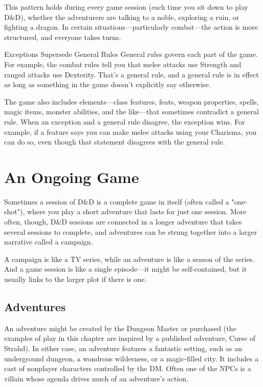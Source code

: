 \documentclass[10pt,a4paper,twoside,bg=print,twocolumn,openany,nodeprecatedcode]{dndbook}
\begin{document}
This pattern holds during every game session (each time you sit down to play D\&D), whether the adventurers are talking to a noble, exploring a ruin, or fighting a dragon. In certain situations—particularly combat—the action is more structured, and everyone takes turns.

\begin{DndSidebar}[float=!b]{Exceptions Supersede General Rules}
General rules govern each part of the game. For example, the combat rules tell you that melee attacks use Strength and ranged attacks use Dexterity. That's a general rule, and a general rule is in effect as long as something in the game doesn't explicitly say otherwise.



The game also includes elements—class features, feats, weapon properties, spells, magic items, monster abilities, and the like—that sometimes contradict a general rule. When an exception and a general rule disagree, the exception wins. For example, if a feature says you can make melee attacks using your Charisma, you can do so, even though that statement disagrees with the general rule.



\end{DndSidebar}

\section{An Ongoing Game}
Sometimes a session of D\&D is a complete game in itself (often called a "one-shot"), where you play a short adventure that lasts for just one session. More often, though, D\&D sessions are connected in a longer adventure that takes several sessions to complete, and adventures can be strung together into a larger narrative called a campaign.

A campaign is like a TV series, while an adventure is like a season of the series. And a game session is like a single episode—it might be self-contained, but it usually links to the larger plot if there is one.

\subsection{Adventures}
An adventure might be created by the Dungeon Master or purchased (the examples of play in this chapter are inspired by a published adventure, Curse of Strahd). In either case, an adventure features a fantastic setting, such as an underground dungeon, a wondrous wilderness, or a magic-filled city. It includes a cast of nonplayer characters controlled by the DM. Often one of the NPCs is a villain whose agenda drives much of an adventure's action.
\end{document}
